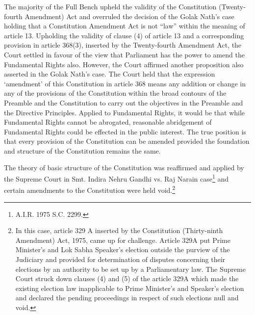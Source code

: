 \begin{multicols}{2}
\noi
The majority of the Full Bench upheld the validity of the Constitution (Twenty-fourth
Amendment) Act and overruled the decision of the Golak Nath’s case holding that a
Constitution Amendment Act is not “law” within the meaning of article 13. Upholding the
validity of clause (4) of article 13 and a corresponding provision in article 368(3), inserted by
the Twenty-fourth Amendment Act, the Court settled in favour of the view that Parliament
has the power to amend the Fundamental Rights also. However, the Court affirmed another
proposition also asserted in the Golak Nath’s case. The Court held that the expression
‘amendment’ of this Constitution in article 368 means any addition or change in any of the
provisions of the Constitution within the broad contours of the Preamble and the Constitution
to carry out the objectives in the Preamble and the Directive Principles. Applied to
Fundamental Rights, it would be that while Fundamental Rights cannot be abrogated,
reasonable abridgement of Fundamental Rights could be effected in the public interest. The
true position is that every provision of the Constitution can be amended provided the
foundation and structure of the Constitution remains the same.

\noi
The theory of basic structure of the Constitution was reaffirmed and applied by the Supreme
Court in Smt. Indira Nehru Gandhi vs. Raj Narain case\footnote{A.I.R. 1975 S.C. 2299.} and certain amendments to the
Constitution were held void.\footnote{In this case, article 329 A inserted by the Constitution (Thirty-ninth Amendment) Act, 1975, came up for challenge. Article 329A put Prime Minister’s and Lok Sabha Speaker’s election outside the purview of the
Judiciary and provided for determination of disputes concerning their elections by an authority to be set up by a
Parliamentary law. The Supreme Court struck down clauses (4) and (5) of the article 329A which made the
existing election law inapplicable to Prime Minister’s and Speaker’s election and declared the pending
proceedings in respect of such elections null and void.}


\end{multicols}

